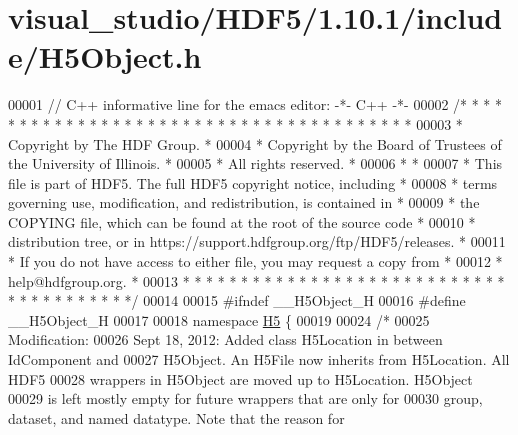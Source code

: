 \hypertarget{visual__studio_2_h_d_f5_21_810_81_2include_2_h5_object_8h_source}{}\section{visual\+\_\+studio/\+H\+D\+F5/1.10.1/include/\+H5\+Object.h}
\label{visual__studio_2_h_d_f5_21_810_81_2include_2_h5_object_8h_source}

\begin{DoxyCode}
00001 \textcolor{comment}{// C++ informative line for the emacs editor: -*- C++ -*-}
00002 \textcolor{comment}{/* * * * * * * * * * * * * * * * * * * * * * * * * * * * * * * * * * * * * * *}
00003 \textcolor{comment}{ * Copyright by The HDF Group.                                               *}
00004 \textcolor{comment}{ * Copyright by the Board of Trustees of the University of Illinois.         *}
00005 \textcolor{comment}{ * All rights reserved.                                                      *}
00006 \textcolor{comment}{ *                                                                           *}
00007 \textcolor{comment}{ * This file is part of HDF5.  The full HDF5 copyright notice, including     *}
00008 \textcolor{comment}{ * terms governing use, modification, and redistribution, is contained in    *}
00009 \textcolor{comment}{ * the COPYING file, which can be found at the root of the source code       *}
00010 \textcolor{comment}{ * distribution tree, or in https://support.hdfgroup.org/ftp/HDF5/releases.  *}
00011 \textcolor{comment}{ * If you do not have access to either file, you may request a copy from     *}
00012 \textcolor{comment}{ * help@hdfgroup.org.                                                        *}
00013 \textcolor{comment}{ * * * * * * * * * * * * * * * * * * * * * * * * * * * * * * * * * * * * * * */}
00014 
00015 \textcolor{preprocessor}{#ifndef \_\_H5Object\_H}
00016 \textcolor{preprocessor}{#define \_\_H5Object\_H}
00017 
00018 \textcolor{keyword}{namespace }\hyperlink{namespace_h5}{H5} \{
00019 
00024 \textcolor{comment}{/*}
00025 \textcolor{comment}{    Modification:}
00026 \textcolor{comment}{        Sept 18, 2012: Added class H5Location in between IdComponent and}
00027 \textcolor{comment}{                H5Object.  An H5File now inherits from H5Location.  All HDF5}
00028 \textcolor{comment}{                wrappers in H5Object are moved up to H5Location.  H5Object}
00029 \textcolor{comment}{                is left mostly empty for future wrappers that are only for}
00030 \textcolor{comment}{                group, dataset, and named datatype.  Note that the reason for}

\end{DoxyCode}
